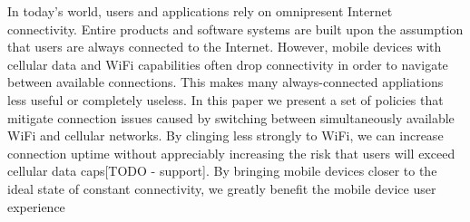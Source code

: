 
In today's world, users and applications rely on omnipresent Internet connectivity. Entire products and software systems are built upon the assumption that users are always connected to the Internet. However, mobile devices with cellular data and WiFi capabilities often drop connectivity in order to navigate between available connections. This makes many always-connected appliations less useful or completely useless. In this paper we present a set of policies that mitigate connection issues caused by switching between simultaneously available WiFi and cellular networks. By clinging less strongly to WiFi, we can increase connection uptime without appreciably increasing the risk that users will exceed cellular data caps[TODO - support]. By bringing mobile devices closer to the ideal state of constant connectivity, we greatly benefit the mobile device user experience